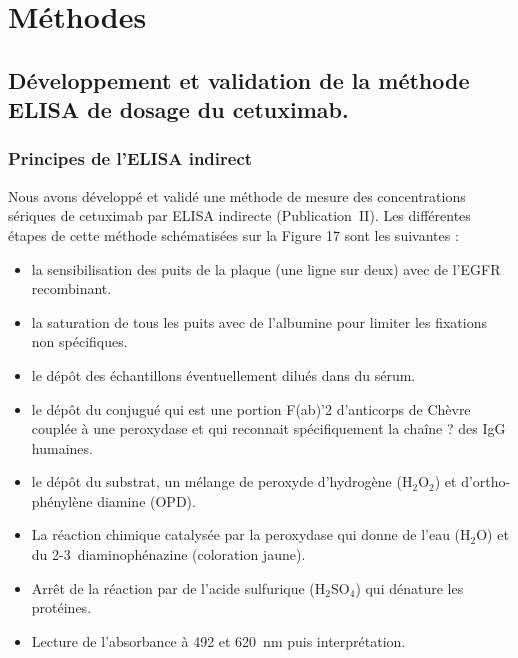 \chapter{Méthodes}

\section{Développement et validation de la méthode ELISA de dosage du cetuximab.}

\subsection{Principes de l'ELISA indirect}

Nous avons développé et validé une méthode de mesure des concentrations sériques de cetuximab par ELISA indirecte (Publication~II). Les différentes étapes de cette méthode schématisées sur la Figure 17 sont les suivantes :
\begin{itemize}
\item la sensibilisation des puits de la plaque (une ligne sur deux) avec de l'EGFR recombinant.
\item la saturation de tous les puits avec de l'albumine pour limiter les fixations non spécifiques.
\item le dépôt des échantillons éventuellement dilués dans du sérum. 
\item le dépôt du conjugué qui est une portion F(ab)'2 d'anticorps de Chèvre couplée à une peroxydase et qui reconnait spécifiquement la chaîne ? des IgG humaines. 
\item le dépôt du substrat, un mélange de peroxyde d'hydrogène (H$_2$O$_2$) et d'ortho-phénylène diamine (OPD).
\item La réaction chimique catalysée par la peroxydase qui donne de l'eau (H$_2$O) et du 
2-3~diaminophénazine (coloration jaune).
\item Arrêt de la réaction par de l'acide sulfurique (H$_2$SO$_4$) qui dénature les protéines.
\item Lecture de l'absorbance à 492 et 620~nm puis interprétation.
\end{itemize}

